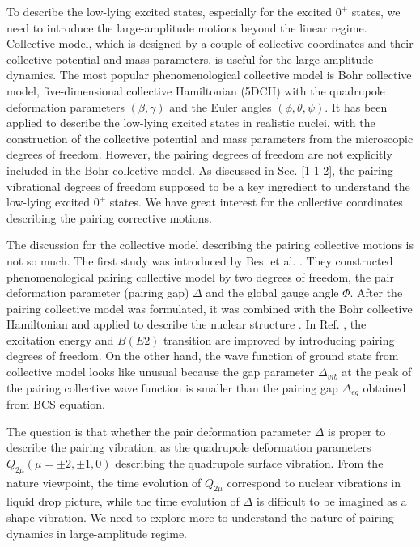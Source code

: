 \documentclass[11pt]{book} %
\begin{document}
To describe the low-lying excited states, especially for the excited $0^+$ states, we need to introduce the large-amplitude motions beyond the linear regime.
Collective model, which is designed by a couple of collective coordinates and their collective potential and mass parameters, is useful for the large-amplitude dynamics. The most popular phenomenological collective model is Bohr collective model, five-dimensional collective Hamiltonian (5DCH) with the quadrupole deformation parameters $(\beta,\gamma)$ and the Euler angles $(\phi,\theta,\psi)$. It has been applied to describe the low-lying excited states in realistic nuclei, with the construction of the collective potential and mass parameters from the microscopic degrees of freedom. However, the pairing degrees of freedom are not explicitly included in the Bohr collective model. As discussed in Sec. \ref{1-1-2}, the pairing vibrational degrees of freedom supposed to be a key ingredient to understand the low-lying  excited $0^+$ states. We have great interest for the collective coordinates describing the pairing corrective motions.

The discussion for the collective model describing the pairing collective motions is not so much. The first study was introduced by Bes. et al. \cite{BBPK70}. They constructed phenomenological pairing collective model by two degrees of freedom, the pair deformation parameter (pairing gap) $\Delta$ and the global gauge angle $\Phi$. After the pairing collective model was formulated, it was combined with the Bohr collective Hamiltonian and applied to describe the nuclear structure \cite{GPBW85, ZPPRS99, P07}. 
In Ref. \cite{ZPPRS99}, the excitation energy and $B(E2)$ transition are improved by introducing pairing degrees of freedom. On the other hand, the wave function of ground state from collective model looks like unusual because the gap parameter $\Delta_{vib}$ at the peak of the pairing collective wave function is smaller than the pairing gap $\Delta_{eq}$ obtained from BCS equation. 

The question is that whether the pair deformation parameter $\Delta$ is proper to describe the pairing vibration, as the quadrupole deformation parameters $Q_{2\mu} (\mu=\pm2,\pm1,0)$ describing the quadrupole surface vibration. From the nature viewpoint, the time evolution of $Q_{2\mu}$ correspond to nuclear vibrations in liquid drop picture, while the time evolution of $\Delta$ is difficult to be imagined as a shape vibration. We need to explore more to understand the nature of pairing dynamics in large-amplitude regime. 
\end{document}
